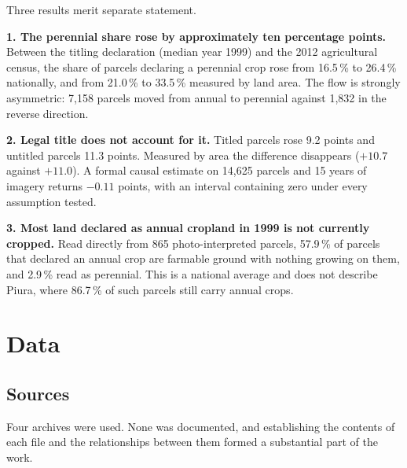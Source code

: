 \documentclass[11pt,a4paper]{article}
\begin{document}
Three results merit separate statement.

\textbf{1. The perennial share rose by approximately ten percentage points.} Between the titling
declaration (median year 1999) and the 2012 agricultural census, the share of parcels declaring a
perennial crop rose from 16.5\,\% to 26.4\,\% nationally, and from 21.0\,\% to 33.5\,\% measured
by land area. The flow is strongly asymmetric: 7{,}158 parcels moved from annual to perennial
against 1{,}832 in the reverse direction.

\textbf{2. Legal title does not account for it.} Titled parcels rose 9.2 points and untitled
parcels 11.3 points. Measured by area the difference disappears ($+10.7$ against $+11.0$). A
formal causal estimate on 14{,}625 parcels and 15 years of imagery returns $-0.11$ points, with
an interval containing zero under every assumption tested.

\textbf{3. Most land declared as annual cropland in 1999 is not currently cropped.} Read directly
from 865 photo-interpreted parcels, 57.9\,\% of parcels that declared an annual crop are farmable
ground with nothing growing on them, and 2.9\,\% read as perennial. This is a national average
and does not describe Piura, where 86.7\,\% of such parcels still carry annual crops.

\section{Data}

\subsection{Sources}

Four archives were used. None was documented, and establishing the contents of each file and the
relationships between them formed a substantial part of the work.
\end{document}
